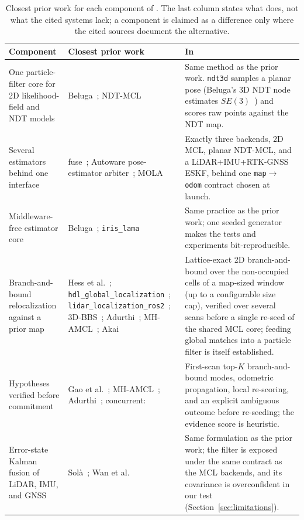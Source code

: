 \begin{table}[t]
\centering
\caption{Closest prior work for each component of \prismloc{}. The last
column states what \prismloc{} does, not what the cited systems lack; a
component is claimed as a difference only where the cited sources
document the alternative.}
\label{tab:positioning}
\footnotesize
\renewcommand{\arraystretch}{1.15}
\begin{tabular}{@{}>{\raggedright\arraybackslash}p{}>{\raggedright\arraybackslash}p{}>{\raggedright\arraybackslash}p{}@{}}
\toprule
Component & Closest prior work & In \prismloc{} \\
\midrule
One particle-filter core for 2D likelihood-field and NDT models
  & Beluga~\cite{puga2024beluga}; NDT-MCL~\cite{saarinen2013ndtmcl}
  & Same method as the prior work. \texttt{ndt3d} samples a planar pose
    (Beluga's 3D NDT node estimates $SE(3)$~\cite{ekumen2022belugarepo})
    and scores raw points against the NDT map. \\
Several estimators behind one interface
  & fuse~\cite{locus2018fuse}; Autoware pose-estimator
    arbiter~\cite{autoware2024arbiter}; MOLA~\cite{blancoclaraco2025mola}
  & Exactly three backends, 2D MCL, planar NDT-MCL, and a
    LiDAR+IMU+RTK-GNSS ESKF, behind one \texttt{map}$\to$\texttt{odom}
    contract chosen at launch. \\
Middleware-free estimator core
  & Beluga~\cite{puga2024beluga}; \texttt{iris\_lama}~\cite{pedrosa2019lama}
  & Same practice as the prior work; one seeded generator makes the tests
    and experiments bit-reproducible. \\
Branch-and-bound relocalization against a prior map
  & Hess et al.~\cite{hess2016realtime};
    \texttt{hdl\_global\_localization}~\cite{koide2021hdlgl};
    \texttt{lidar\_localization\_ros2}~\cite{sasaki2026globalloc};
    3D-BBS~\cite{aoki2024bbs3d}; Adurthi~\cite{adurthi2023scan};
    MH-AMCL~\cite{garcia2023mhamcl}; Akai~\cite{akai2023reliable}
  & Lattice-exact 2D branch-and-bound over the non-occupied cells of a
    map-sized window (up to a configurable size cap), verified over several
    scans before a single re-seed of the shared MCL core; feeding global
    matches into a particle filter is itself established. \\
Hypotheses verified before commitment
  & Gao et al.~\cite{gao2019global}; MH-AMCL~\cite{garcia2023mhamcl};
    Adurthi~\cite{adurthi2023scan}; concurrent:
    \cite{zhang2026movefirst}
  & First-scan top-$K$ branch-and-bound modes, odometric propagation,
    local re-scoring, and an explicit ambiguous outcome before re-seeding;
    the evidence score is heuristic. \\
Error-state Kalman fusion of LiDAR, IMU, and GNSS
  & Sol\`a~\cite{sola2017quaternion}; Wan et al.~\cite{wan2018robust}
  & Same formulation as the prior work; the filter is exposed under the same
    contract as the MCL backends, and its covariance is overconfident in our
    test (Section~\ref{sec:limitations}). \\
\bottomrule
\end{tabular}
\end{table}

